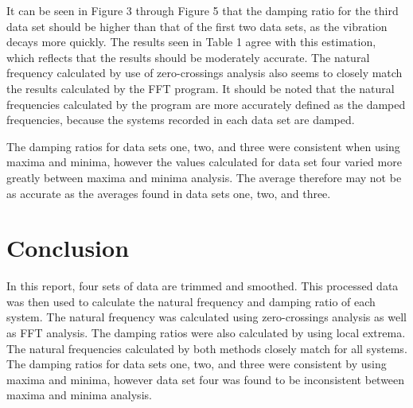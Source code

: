 \documentclass[11pt]{article}
\begin{document}
It can be seen in Figure 3 through Figure 5 that the damping ratio for the third data set should be higher than that of the first two data sets, as the vibration decays more quickly. The results seen in Table 1 agree with this estimation, which reflects that the results should be moderately accurate. The natural frequency calculated by use of zero-crossings analysis also seems to closely match the results calculated by the FFT program. It should be noted that the natural frequencies calculated by the program are more accurately defined as the damped frequencies, because the systems recorded in each data set are damped.
\bigskip

The damping ratios for data sets one, two, and three were consistent when using maxima and minima, however the values calculated for data set four varied more greatly between maxima and minima analysis. The average therefore may not be as accurate as the averages found in data sets one, two, and three.
\bigskip


\section{Conclusion}
\label{sec:conclusion}
\vspace{-0.2in}
In this report, four sets of data are trimmed and smoothed. This processed data was then used to calculate the natural frequency and damping ratio of each system. The natural frequency was calculated using zero-crossings analysis as well as FFT analysis. The damping ratios were also calculated by using local extrema. The natural frequencies calculated by both methods closely match for all systems. The damping ratios for data sets one, two, and three were consistent by using maxima and minima, however data set four was found to be inconsistent between maxima and minima analysis.
\end{document}
